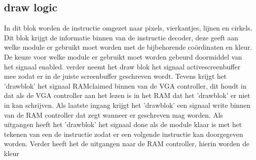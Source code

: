 \documentclass{scrartcl}
\begin{document}
\subsection { draw logic}

In dit blok worden de instructie omgezet naar pixels, vierkantjes, lijnen en cirkels. Dit blok krijgt de informatie binnen van de instructie decoder, deze geeft aan welke module er gebruikt moet worden met de bijbehorende coördinaten en kleur.
De keuze voor welke module er gebruikt moet worden gebeurd doormiddel van het signaal enabled. verder neemt het draw blok het signaal activescreenbuffer mee zodat er in de juiste screenbuffer geschreven wordt. Tevens krijgt het 'drawblok' het signaal RAMclaimed binnen van de VGA controller, dit houdt in dat als de VGA controller aan het lezen is in het RAM dat het 'drawblok' er niet in kan schrijven. Als laatste ingang krijgt het 'drawblok' een signaal write binnen van de RAM controller dat zegt wanneer er geschreven mag worden.
Als uitgangen heeft het 'drawblok' het signaal done als de module klaar is met het tekenen van een de instructie zodat er een volgende instructie kan doorgegeven worden. Verder heeft het de uitgangen naar de RAM controller, hierin worden de kleur 
\end{document}

